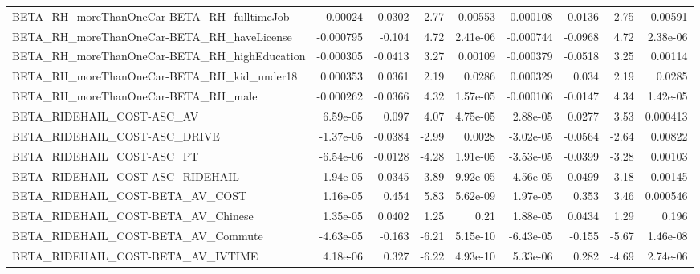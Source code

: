 \begin{tabular}{lrrrrrrrr}
BETA\_RH\_moreThanOneCar-BETA\_RH\_fulltimeJob         &     0.00024 &       0.0302 &     2.77 &  0.00553 &   0.000108 &      0.0136 &         2.75 &       0.00591 \\
BETA\_RH\_moreThanOneCar-BETA\_RH\_haveLicense         &   -0.000795 &       -0.104 &     4.72 & 2.41e-06 &  -0.000744 &     -0.0968 &         4.72 &      2.38e-06 \\
BETA\_RH\_moreThanOneCar-BETA\_RH\_highEducation       &   -0.000305 &      -0.0413 &     3.27 &  0.00109 &  -0.000379 &     -0.0518 &         3.25 &       0.00114 \\
BETA\_RH\_moreThanOneCar-BETA\_RH\_kid\_under18         &    0.000353 &       0.0361 &     2.19 &   0.0286 &   0.000329 &       0.034 &         2.19 &        0.0285 \\
BETA\_RH\_moreThanOneCar-BETA\_RH\_male                &   -0.000262 &      -0.0366 &     4.32 & 1.57e-05 &  -0.000106 &     -0.0147 &         4.34 &      1.42e-05 \\
BETA\_RIDEHAIL\_COST-ASC\_AV                          &    6.59e-05 &        0.097 &     4.07 & 4.75e-05 &   2.88e-05 &      0.0277 &         3.53 &      0.000413 \\
BETA\_RIDEHAIL\_COST-ASC\_DRIVE                       &   -1.37e-05 &      -0.0384 &    -2.99 &   0.0028 &  -3.02e-05 &     -0.0564 &        -2.64 &       0.00822 \\
BETA\_RIDEHAIL\_COST-ASC\_PT                          &   -6.54e-06 &      -0.0128 &    -4.28 & 1.91e-05 &  -3.53e-05 &     -0.0399 &        -3.28 &       0.00103 \\
BETA\_RIDEHAIL\_COST-ASC\_RIDEHAIL                    &    1.94e-05 &       0.0345 &     3.89 & 9.92e-05 &  -4.56e-05 &     -0.0499 &         3.18 &       0.00145 \\
BETA\_RIDEHAIL\_COST-BETA\_AV\_COST                    &    1.16e-05 &        0.454 &     5.83 & 5.62e-09 &   1.97e-05 &       0.353 &         3.46 &      0.000546 \\
BETA\_RIDEHAIL\_COST-BETA\_AV\_Chinese                 &    1.35e-05 &       0.0402 &     1.25 &     0.21 &   1.88e-05 &      0.0434 &         1.29 &         0.196 \\
BETA\_RIDEHAIL\_COST-BETA\_AV\_Commute                 &   -4.63e-05 &       -0.163 &    -6.21 & 5.15e-10 &  -6.43e-05 &      -0.155 &        -5.67 &      1.46e-08 \\
BETA\_RIDEHAIL\_COST-BETA\_AV\_IVTIME                  &    4.18e-06 &        0.327 &    -6.22 & 4.93e-10 &   5.33e-06 &       0.282 &        -4.69 &      2.74e-06 \\

\end{tabular}
